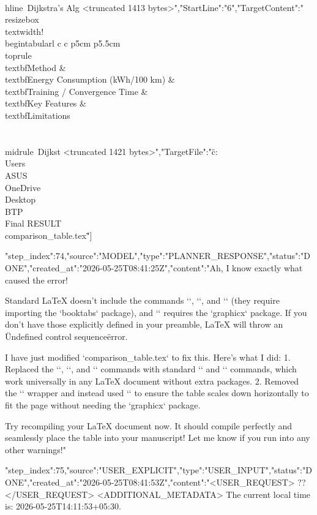 \begin{table}[t]
{\begin{table}[t]
{{{\\hline\
Dijkstra's Alg
<truncated 1413 bytes>","StartLine":"6","TargetContent":"\"\\resizebox{\\textwidth}{!}{\
\\begin{tabular}{l c c p{5cm} p{5.5cm}}\
\\toprule\
\\textbf{Method} & \\textbf{Energy Consumption (kWh/100 km)} & \\textbf{Training / Convergence Time} & \\textbf{Key Features} & \\textbf{Limitations} \\\\\
\\midrule\
Dijkst
<truncated 1421 bytes>","TargetFile":"\"c:\\Users\\ASUS\\OneDrive\\Desktop\\BTP\\Final RESULT\\comparison_table.tex\""}}]}
{"step_index":74,"source":"MODEL","type":"PLANNER_RESPONSE","status":"DONE","created_at":"2026-05-25T08:41:25Z","content":"Ah, I know exactly what caused the error!

Standard LaTeX doesn't include the commands `\toprule`, `\midrule`, and `\bottomrule` (they require importing the `booktabs` package), and `\resizebox` requires the `graphicx` package. If you don't have those explicitly defined in your preamble, LaTeX will throw an \"Undefined control sequence\" error.

I have just modified `comparison_table.tex` to fix this. Here's what I did:
1. Replaced the `\toprule`, `\midrule`, and `\bottomrule` commands with standard `\hline \hline` and `\hline` commands, which work universally in any LaTeX document without extra packages.
2. Removed the `\resizebox` wrapper and instead used `\footnotesize` to ensure the table scales down horizontally to fit the page without needing the `graphicx` package.

Try recompiling your LaTeX document now. It should compile perfectly and seamlessly place the table into your manuscript! Let me know if you run into any other warnings!"}
{"step_index":75,"source":"USER_EXPLICIT","type":"USER_INPUT","status":"DONE","created_at":"2026-05-25T08:41:53Z","content":"<USER_REQUEST>
 ??
</USER_REQUEST>
<ADDITIONAL_METADATA>
The current local time is: 2026-05-25T14:11:53+05:30.

}}
\end{table}}
\end{table}
